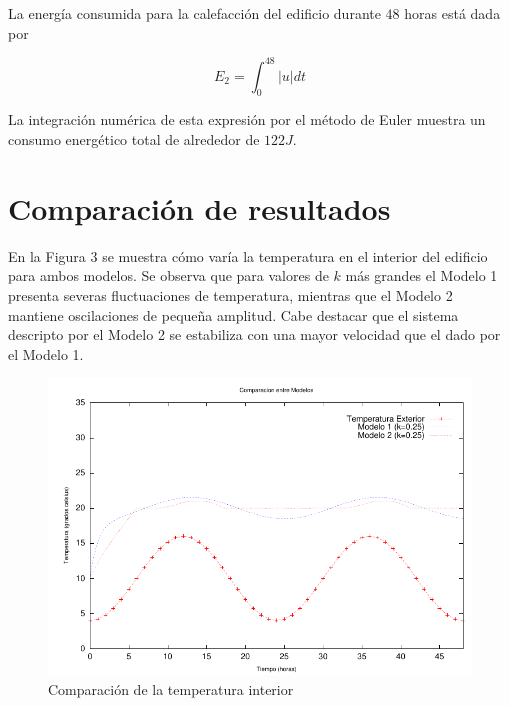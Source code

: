 \documentclass{sig-alternate}
\begin{document}
La energ\'{i}a consumida para la calefacci\'{o}n del edificio durante $48$ horas
est\'{a} dada por

\begin{equation}
\label{energia_segundo_modelo}
E_{2} = \int_{0}^{48} | u | dt
\end{equation}

La integraci\'{o}n num\'{e}rica de esta expresi\'{o}n por el m\'{e}todo de
Euler muestra un consumo energ\'{e}tico total de alrededor de $122J$.

\section{Comparaci\'{o}n de resultados}\label{resultados}

En la Figura $3$ se muestra c\'{o}mo var\'{i}a 
la temperatura en el interior del edificio para ambos modelos. Se observa
que para valores de $k$ m\'{a}s grandes el Modelo 1 presenta se\-ve\-ras
fluctuaciones de temperatura, mientras que el Modelo 2 mantiene oscilaciones
de peque\~{n}a amplitud. Cabe destacar que el sistema descripto por el Modelo 2 
se estabiliza con una mayor velocidad que el dado por el Modelo 1.

\begin{figure}[hp]
\label{comparacion_temp_interior}
\centering
\includegraphics[scale=1.05]{graficos/ej1c}
\caption{Comparaci\'{o}n de la temperatura interior}
\end{figure}
\end{document}
